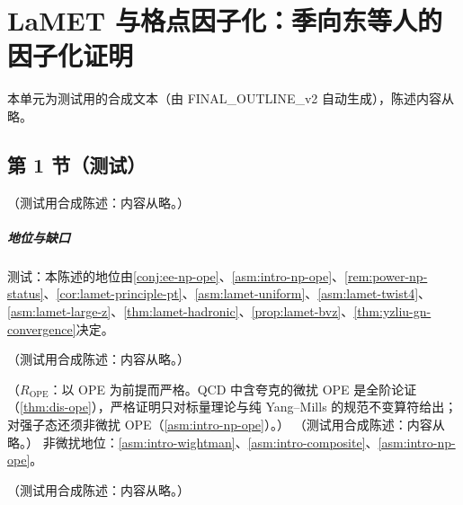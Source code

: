 \chapter{LaMET 与格点因子化：季向东等人的因子化证明}\label{ch:lamet}
本单元为测试用的合成文本（由 FINAL\_OUTLINE\_v2 自动生成），陈述内容从略。

\section{第 1 节（测试）}\label{sec:lamet-intro}

\begin{conjecture}\label{conj:lamet-principle}
（测试用合成陈述：内容从略。）
\end{conjecture}
\paragraph{地位与缺口}测试：本陈述的地位由\cref{conj:ee-np-ope}、\cref{asm:intro-np-ope}、\cref{rem:power-np-status}、\cref{cor:lamet-principle-pt}、\cref{asm:lamet-uniform}、\cref{asm:lamet-twist4}、\cref{asm:lamet-large-z}、\cref{thm:lamet-hadronic}、\cref{prop:lamet-bvz}、\cref{thm:yzliu-gn-convergence}决定。

\begin{remark}\label{rem:lamet-formulations}
（测试用合成陈述：内容从略。）
\end{remark}

\begin{proposition}\label{prop:lattice-moments}
（$R_{\mathrm{OPE}}$：以 OPE 为前提而严格。QCD 中含夸克的微扰 OPE 是全阶论证（\cref{thm:dis-ope}），严格证明只对标量理论与纯 Yang--Mills 的规范不变算符给出；对强子态还须非微扰 OPE（\cref{asm:intro-np-ope}）。）
（测试用合成陈述：内容从略。）
非微扰地位：\cref{asm:intro-wightman}、\cref{asm:intro-composite}、\cref{asm:intro-np-ope}。
\end{proposition}

\begin{definition}\label{def:lattice-quasi}
（测试用合成陈述：内容从略。）
\end{definition}

